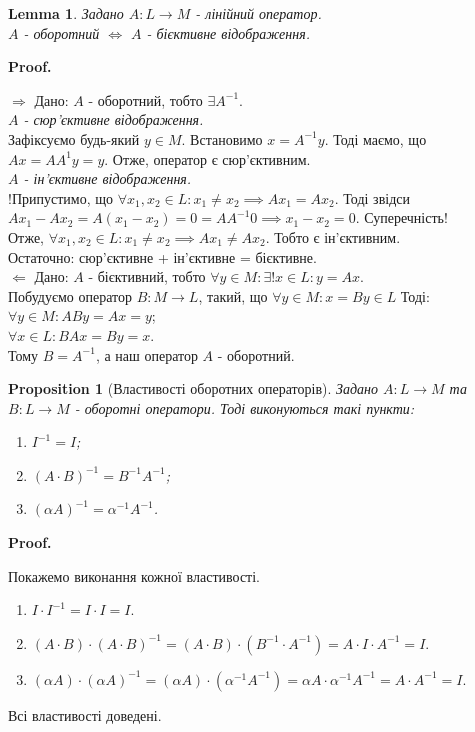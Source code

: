 \documentclass[a4paper, 10pt]{article}
\makeatletter
\def\rightproof{$\boxed{\Rightarrow}$ }
\def\leftproof{$\boxed{\Leftarrow}$ }
\theoremstyle{theoremdd}
\newtheorem{proposition}[theorem]{Proposition}
\newtheorem{lemma}[theorem]{Lemma}
\renewenvironment{proof}[1][Proof.\\]{\par
\pushQED{\hfill \qed}%
\normalfont \topsep6\p@\@plus6\p@\relax
\trivlist
\item\relax
{\bfseries
#1\@addpunct{.}}\hspace\labelsep\ignorespaces
}{%
\popQED\endtrivlist\@endpefalse
}
\makeatother
\begin{document}
	\begin{lemma}
	\label{invertibility_criterion}
	Задано $A \colon L \to M$ - лінійний оператор.\\
	$A$ - оборотний $\iff$ $A$ - бієктивне відображення.
	\end{lemma}
	
	\begin{proof}
	\rightproof Дано: $A$ - оборотний, тобто $\exists A^{-1}$.\\
	\textit{$A$ - сюр'єктивне відображення.}\\
	Зафіксуємо будь-який $y \in M$. Встановимо $x = A^{-1}y$. Тоді маємо, що $Ax = AA^{1}y = y$. Отже, оператор є сюр'єктивним.\\
	\textit{$A$ - ін'єктивне відображення.}\\
	!Припустимо, що $\forall x_1,x_2 \in L: x_1 \neq x_2 \implies Ax_1 = Ax_2$. Тоді звідси $Ax_1 - Ax_2 = A(x_1-x_2)=0=AA^{-1}0 \implies x_1 - x_2 = 0$. Суперечність! \\
	Отже, $\forall x_1,x_2 \in L: x_1 \neq x_2 \implies Ax_1 \neq Ax_2$. Тобто є ін'єктивним.\\
	Остаточно: сюр'єктивне + ін'єктивне = бієктивне.
	\bigskip \\
	\leftproof Дано: $A$ - бієктивний, тобто $\forall y \in M: \exists! x \in L: y=  Ax$.\\
	Побудуємо оператор $B \colon M \to L$, такий, що $\forall y \in M: x = By \in L$ Тоді:\\
	$\forall y \in M: ABy = Ax = y$;\\
	$\forall x \in L: BAx = By = x$.\\
	Тому $B = A^{-1}$, а наш оператор $A$ - оборотний.
	\end{proof}
	
	\begin{proposition}[Властивості оборотних операторів]
	Задано $A \colon L \to M$ та $B \colon L \to M$ - оборотні оператори. Тоді виконуються такі пункти:
	\begin{enumerate}[nosep, wide=0pt, label={\arabic*)}]
	\item $I^{-1} = I$;
	\item $(A \cdot B)^{-1} = B^{-1} A^{-1}$;
	\item $(\alpha A)^{-1} = \alpha^{-1} A^{-1}$.
	\end{enumerate}
	\end{proposition}
	
	\begin{proof}
	Покажемо виконання кожної властивості.
	\begin{enumerate}[topsep=-\parskip, wide=0pt, label={\arabic*)}]
	\item $I \cdot I^{-1} = I \cdot I = I$.
	\item $(A \cdot B) \cdot (A \cdot B)^{-1} = (A \cdot B) \cdot (B^{-1} \cdot A^{-1}) = A \cdot I \cdot A^{-1} = I$.
	\item $(\alpha A) \cdot (\alpha A)^{-1} = (\alpha A) \cdot (\alpha^{-1} A^{-1}) = \alpha A \cdot \alpha^{-1} A^{-1} = A \cdot A^{-1} = I$.
	\end{enumerate}
	Всі властивості доведені.
	\end{proof}
	
\end{document}
